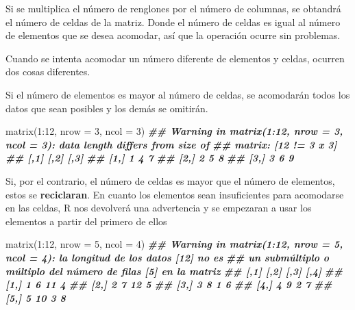 \documentclass[
]{book}
\newenvironment{Shaded}{\begin{snugshade}}{\end{snugshade}}
\newcommand{\AttributeTok}[1]{\textcolor[rgb]{0.77,0.63,0.00}{#1}}
\newcommand{\DecValTok}[1]{\textcolor[rgb]{0.00,0.00,0.81}{#1}}
\newcommand{\DocumentationTok}[1]{\textcolor[rgb]{0.56,0.35,0.01}{\textbf{\textit{#1}}}}
\newcommand{\FunctionTok}[1]{\textcolor[rgb]{0.00,0.00,0.00}{#1}}
\newcommand{\NormalTok}[1]{#1}
\newcommand{\SpecialCharTok}[1]{\textcolor[rgb]{0.00,0.00,0.00}{#1}}
\begin{document}
Si se multiplica el número de renglones por el número de columnas, se obtandrá el número de celdas de la matriz. Donde el número de celdas es igual al número de elementos que se desea acomodar, así que la operación ocurre sin problemas.

Cuando se intenta acomodar un número diferente de elementos y celdas, ocurren dos cosas diferentes.

Si el número de elementos es mayor al número de celdas, se acomodarán todos los datos que sean posibles y los demás se omitirán.

\begin{Shaded}
\begin{Highlighting}[]
\FunctionTok{matrix}\NormalTok{(}\DecValTok{1}\SpecialCharTok{:}\DecValTok{12}\NormalTok{, }\AttributeTok{nrow =} \DecValTok{3}\NormalTok{, }\AttributeTok{ncol =} \DecValTok{3}\NormalTok{)}
\DocumentationTok{\#\# Warning in matrix(1:12, nrow = 3, ncol = 3): data length differs from size of}
\DocumentationTok{\#\# matrix: [12 != 3 x 3]}
\DocumentationTok{\#\#      [,1] [,2] [,3]}
\DocumentationTok{\#\# [1,]    1    4    7}
\DocumentationTok{\#\# [2,]    2    5    8}
\DocumentationTok{\#\# [3,]    3    6    9}
\end{Highlighting}
\end{Shaded}

Si, por el contrario, el número de celdas es mayor que el número de elementos, estos se \textbf{reciclaran}. En cuanto los elementos sean insuficientes para acomodarse en las celdas, R nos devolverá una advertencia y se empezaran a usar los elementos a partir del primero de ellos

\begin{Shaded}
\begin{Highlighting}[]
\FunctionTok{matrix}\NormalTok{(}\DecValTok{1}\SpecialCharTok{:}\DecValTok{12}\NormalTok{, }\AttributeTok{nrow =} \DecValTok{5}\NormalTok{, }\AttributeTok{ncol =} \DecValTok{4}\NormalTok{)}
\DocumentationTok{\#\# Warning in matrix(1:12, nrow = 5, ncol = 4): la longitud de los datos [12] no es}
\DocumentationTok{\#\# un submúltiplo o múltiplo del número de filas [5] en la matriz}
\DocumentationTok{\#\#      [,1] [,2] [,3] [,4]}
\DocumentationTok{\#\# [1,]    1    6   11    4}
\DocumentationTok{\#\# [2,]    2    7   12    5}
\DocumentationTok{\#\# [3,]    3    8    1    6}
\DocumentationTok{\#\# [4,]    4    9    2    7}
\DocumentationTok{\#\# [5,]    5   10    3    8}
\end{Highlighting}
\end{Shaded}
\end{document}
